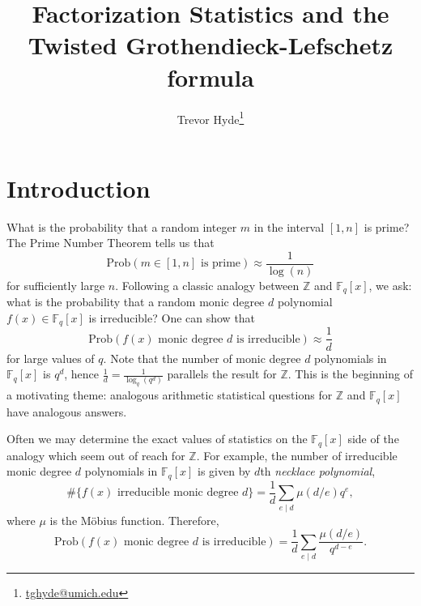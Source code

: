 \documentclass[submission]{FPSAC2018}
\theoremstyle{definition}
\numberwithin{equation}{section}
\def\ZZ{\mathbb{Z}}
\def\FF{\mathbb{F}}
\begin{document}
\title[Factorization Statistics]{Factorization Statistics and the\\ Twisted Grothendieck-Lefschetz formula}

\author{Trevor Hyde\thanks{\href{mailto:tghyde@umich.edu}{tghyde@umich.edu}}}

\address{Dept. of Mathematics\\
University of Michigan \\
Ann Arbor, MI 48109-1043\\
}

\maketitle


\section{Introduction}
What is the probability that a random integer $m$ in the interval $[1,n]$ is prime? The Prime Number Theorem tells us that
\[
    \mathrm{Prob}(m \in [1,n]\text{ is prime}) \approx \frac{1}{\log(n)}
\]
for sufficiently large $n$. Following a classic analogy between $\ZZ$ and $\FF_q[x]$, we ask: what is the  probability that a random monic degree $d$ polynomial $f(x) \in \FF_q[x]$ is irreducible? One can show that
\begin{equation}
\label{eqn 1}
    \mathrm{Prob}(f(x)\text{ monic degree $d$ is irreducible}) \approx \frac{1}{d}
\end{equation}
for large values of $q$. Note that the number of monic degree $d$ polynomials in $\FF_q[x]$ is $q^d$, hence $\frac{1}{d} = \frac{1}{\log_q (q^d)}$ parallels the result for $\ZZ$. This is the beginning of a motivating theme: analogous arithmetic statistical questions for $\ZZ$ and $\FF_q[x]$ have analogous answers. 

Often we may determine the exact values of statistics on the $\FF_q[x]$ side of the analogy which seem out of reach for $\ZZ$.  For example, the number of irreducible monic degree $d$ polynomials in $\FF_q[x]$ is given by $d$th \emph{necklace polynomial},
\[
    \#\{f(x) \text{ irreducible monic degree $d$}\} = \frac{1}{d}\sum_{e\mid d}\mu(d/e)q^e,
\]
where $\mu$ is the M\"{o}bius function. Therefore,
\begin{equation}
\label{eqn irred prob} 
    \mathrm{Prob}(f(x)\text{ monic degree $d$ is irreducible}) = \frac{1}{d}\sum_{e\mid d}\frac{\mu(d/e)}{q^{d-e}}.
\end{equation}
\end{document}
